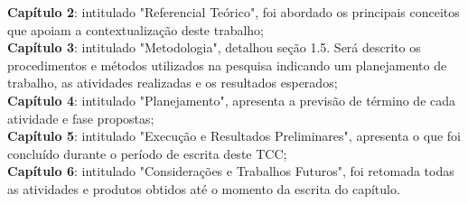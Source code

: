 \textbf{Capítulo 2}: intitulado "Referencial Teórico", foi abordado os principais conceitos que apoiam a contextualização deste trabalho;\\

\textbf{Capítulo 3}: intitulado "Metodologia", detalhou seção 1.5. Será descrito os procedimentos e métodos utilizados na pesquisa indicando um planejamento de trabalho, as atividades realizadas e os resultados esperados;\\

\textbf{Capítulo 4}: intitulado "Planejamento", apresenta a previsão de término de cada atividade e fase propostas;\\

\textbf{Capítulo 5}: intitulado "Execução e Resultados Preliminares", apresenta o que foi concluído durante o período de escrita deste TCC;\\

\textbf{Capítulo 6}: intitulado "Considerações e Trabalhos Futuros", foi retomada todas as atividades e produtos obtidos até o momento da escrita do capítulo.
